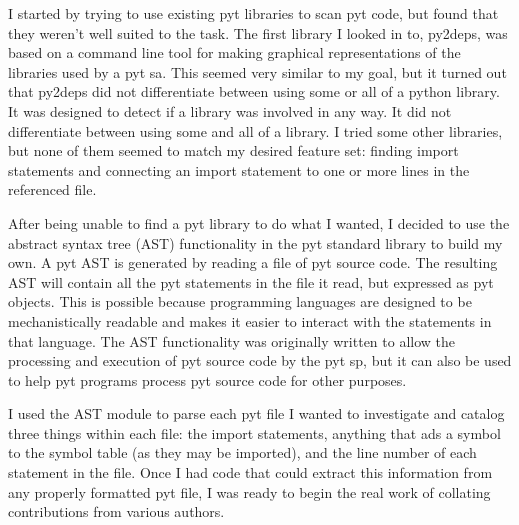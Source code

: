 \documentclass[a4paper,man,natbib,floatsintext]{apa6}
\begin{document}
  I started by trying to use existing \gls{pyt} libraries to scan \Gls{pyt} code, but found that they weren't well suited to the task. The first library I looked in to, py2deps, was based on a command line tool for making graphical representations of the libraries used by a \Gls{pyt} \gls{sa}. This seemed very similar to my goal, but it turned out that py2deps did not differentiate between using some or all of a python library. It was designed to detect if a library was involved in any way. It did not differentiate between using some and all of a library. I tried some other libraries, but none of them seemed to match my desired feature set: finding import statements and connecting an import statement to one or more lines in the referenced file.

  After being unable to find a \Gls{pyt} library to do what I wanted, I decided to use the abstract syntax tree (AST) functionality in the \Gls{pyt} standard library to build my own. A \Gls{pyt} AST is generated by reading a file of \Gls{pyt} source code. The resulting AST will contain all the \Gls{pyt} statements in the file it read, but expressed as \Gls{pyt} objects. This is possible because programming languages are designed to be mechanistically readable and makes it easier to interact with the statements in that language. The AST functionality was originally written to allow the processing and execution of \Gls{pyt} source code by the \Gls{pyt} \gls{sp}, but it can also be used to help \Gls{pyt} programs process \Gls{pyt} source code for other purposes.

  I used the AST module to parse each \Gls{pyt} file I wanted to investigate and catalog three things within each file: the import statements, anything that ads a symbol to the symbol table (as they may be imported), and the line number of each statement in the file. Once I had code that could extract this information from any properly formatted \Gls{pyt} file, I was ready to begin the real work of collating contributions from various authors.
\end{document}
